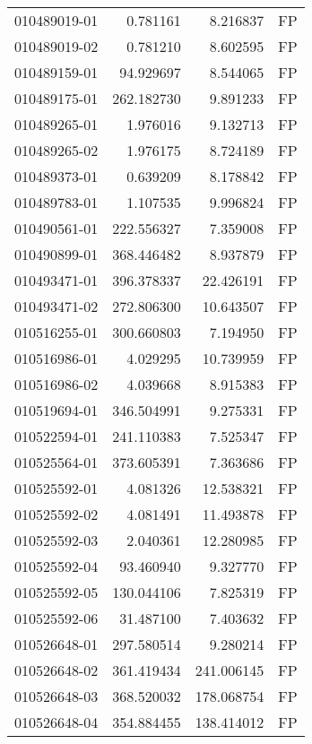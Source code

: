 \begin{tabular}{lrrl}
010489019-01 &    0.781161 &       8.216837 &   FP \\
010489019-02 &    0.781210 &       8.602595 &   FP \\
010489159-01 &   94.929697 &       8.544065 &   FP \\
010489175-01 &  262.182730 &       9.891233 &   FP \\
010489265-01 &    1.976016 &       9.132713 &   FP \\
010489265-02 &    1.976175 &       8.724189 &   FP \\
010489373-01 &    0.639209 &       8.178842 &   FP \\
010489783-01 &    1.107535 &       9.996824 &   FP \\
010490561-01 &  222.556327 &       7.359008 &   FP \\
010490899-01 &  368.446482 &       8.937879 &   FP \\
010493471-01 &  396.378337 &      22.426191 &   FP \\
010493471-02 &  272.806300 &      10.643507 &   FP \\
010516255-01 &  300.660803 &       7.194950 &   FP \\
010516986-01 &    4.029295 &      10.739959 &   FP \\
010516986-02 &    4.039668 &       8.915383 &   FP \\
010519694-01 &  346.504991 &       9.275331 &   FP \\
010522594-01 &  241.110383 &       7.525347 &   FP \\
010525564-01 &  373.605391 &       7.363686 &   FP \\
010525592-01 &    4.081326 &      12.538321 &   FP \\
010525592-02 &    4.081491 &      11.493878 &   FP \\
010525592-03 &    2.040361 &      12.280985 &   FP \\
010525592-04 &   93.460940 &       9.327770 &   FP \\
010525592-05 &  130.044106 &       7.825319 &   FP \\
010525592-06 &   31.487100 &       7.403632 &   FP \\
010526648-01 &  297.580514 &       9.280214 &   FP \\
010526648-02 &  361.419434 &     241.006145 &   FP \\
010526648-03 &  368.520032 &     178.068754 &   FP \\
010526648-04 &  354.884455 &     138.414012 &   FP \\

\end{tabular}
